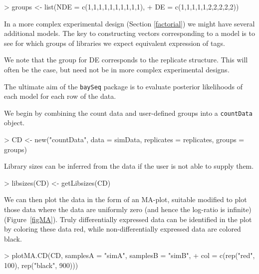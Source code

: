 \documentclass[a4paper]{article}
\begin{document}
\begin{Schunk}
\begin{Sinput}
> groups <- list(NDE = c(1,1,1,1,1,1,1,1,1,1),
+                DE = c(1,1,1,1,1,2,2,2,2,2))
\end{Sinput}
\end{Schunk}

In a more complex experimental design (Section \ref{factorial}) we might have several additional models. The key to constructing vectors corresponding to a model is to see for which groups of libraries we expect equivalent expression of tags.

We note that the group for DE corresponds to the replicate structure. This will often be the case, but need not be in more complex experimental designs.

The ultimate aim of the \verb'baySeq' package is to evaluate posterior likelihoods of each model for each row of the data.

We begin by combining the count data and user-defined groups into a \verb'countData' object.

\begin{Schunk}
\begin{Sinput}
> CD <- new("countData", data = simData, replicates = replicates, groups = groups)
\end{Sinput}
\end{Schunk}

Library sizes can be inferred from the data if the user is not able to supply them.

\begin{Schunk}
\begin{Sinput}
>   libsizes(CD) <- getLibsizes(CD)
\end{Sinput}
\end{Schunk}

We can then plot the data in the form of an MA-plot, suitable modified to plot those data where the data are uniformly zero (and hence the log-ratio is infinite) (Figure~\ref{figMA}). Truly differentially expressed data can be identified in the plot by coloring these data red, while non-differentially expressed data are colored black.

\begin{Schunk}
\begin{Sinput}
> plotMA.CD(CD, samplesA = "simA", samplesB = "simB",
+           col = c(rep("red", 100), rep("black", 900)))
\end{Sinput}
\end{Schunk}
\end{document}

